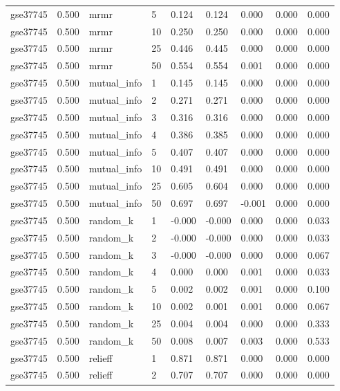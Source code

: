 \begin{table}[t]
\begin{tabular}{lllllllll}
    gse37745 & 0.500 & mrmr & 5 & 0.124 & 0.124 & 0.000 & 0.000 & 0.000 \\
    gse37745 & 0.500 & mrmr & 10 & 0.250 & 0.250 & 0.000 & 0.000 & 0.000 \\
    gse37745 & 0.500 & mrmr & 25 & 0.446 & 0.445 & 0.000 & 0.000 & 0.000 \\
    gse37745 & 0.500 & mrmr & 50 & 0.554 & 0.554 & 0.001 & 0.000 & 0.000 \\
    gse37745 & 0.500 & mutual\_info & 1 & 0.145 & 0.145 & 0.000 & 0.000 & 0.000 \\
    gse37745 & 0.500 & mutual\_info & 2 & 0.271 & 0.271 & 0.000 & 0.000 & 0.000 \\
    gse37745 & 0.500 & mutual\_info & 3 & 0.316 & 0.316 & 0.000 & 0.000 & 0.000 \\
    gse37745 & 0.500 & mutual\_info & 4 & 0.386 & 0.385 & 0.000 & 0.000 & 0.000 \\
    gse37745 & 0.500 & mutual\_info & 5 & 0.407 & 0.407 & 0.000 & 0.000 & 0.000 \\
    gse37745 & 0.500 & mutual\_info & 10 & 0.491 & 0.491 & 0.000 & 0.000 & 0.000 \\
    gse37745 & 0.500 & mutual\_info & 25 & 0.605 & 0.604 & 0.000 & 0.000 & 0.000 \\
    gse37745 & 0.500 & mutual\_info & 50 & 0.697 & 0.697 & -0.001 & 0.000 & 0.000 \\
    gse37745 & 0.500 & random\_k & 1 & -0.000 & -0.000 & 0.000 & 0.000 & 0.033 \\
    gse37745 & 0.500 & random\_k & 2 & -0.000 & -0.000 & 0.000 & 0.000 & 0.033 \\
    gse37745 & 0.500 & random\_k & 3 & -0.000 & -0.000 & 0.000 & 0.000 & 0.067 \\
    gse37745 & 0.500 & random\_k & 4 & 0.000 & 0.000 & 0.001 & 0.000 & 0.033 \\
    gse37745 & 0.500 & random\_k & 5 & 0.002 & 0.002 & 0.001 & 0.000 & 0.100 \\
    gse37745 & 0.500 & random\_k & 10 & 0.002 & 0.001 & 0.001 & 0.000 & 0.067 \\
    gse37745 & 0.500 & random\_k & 25 & 0.004 & 0.004 & 0.000 & 0.000 & 0.333 \\
    gse37745 & 0.500 & random\_k & 50 & 0.008 & 0.007 & 0.003 & 0.000 & 0.533 \\
    gse37745 & 0.500 & relieff & 1 & 0.871 & 0.871 & 0.000 & 0.000 & 0.000 \\
    gse37745 & 0.500 & relieff & 2 & 0.707 & 0.707 & 0.000 & 0.000 & 0.000 \\

\end{tabular}
\end{table}
